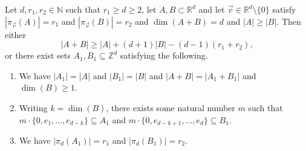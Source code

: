 \begin{lemma} \label{realin}
Let $d, r_1, r_2 \in \mathbb{N}$ such that $r_1 \geq d\geq 2$, let $A, B \subset \mathbb{R}^d$ and let $\vec{v} \in \mathbb{R}^d \setminus \{0\}$ satisfy $|\pi_{\vec{v}}(A)| = r_1$ and $| \pi_{\vec{v}}(B)| = r_2$ and $\dim(A+B) = d$ and $|A| \geq |B|$. Then either 
\begin{equation} \label{ur3}
 |A+B| \geq |A| + (d+1)|B| - (d-1)(r_1 + r_2)  ,
 \end{equation}
or there exist sets $A_1,B_1 \subseteq \mathbb{Z}^d$ satisfying the following. 
\begin{enumerate}
\item We have $|A_1| = |A|$ and $|B_1| = |B|$ and $|A+B| = |A_1+B_1|$ and $\dim(B) \geq 1$.
\item Writing $k = \dim(B)$, there exists some natural number $m$ such that $m \cdot \{0, e_1, \dots, e_{d-k} \} \subseteq A_1$ and  $m \cdot \{0, e_{d-k+1}, \dots, e_d\} \subseteq B_1$.
\item We have $|\pi_{d}(A_1)| = r_1$ and $|\pi_{d}(B_1)| = r_2$.
\end{enumerate}
\end{lemma}

